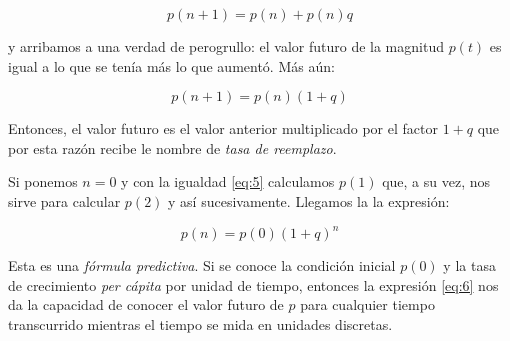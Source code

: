  \begin{equation} \label{eq:4}
 p(n+1)=p(n)+p(n)q
\end{equation}

\noindent y arribamos a una verdad de perogrullo: el valor futuro de la magnitud $p(t)$ es igual a lo que se tenía más lo que aumentó. Más aún:

 \begin{equation} \label{eq:5}
 p(n+1)=p(n)(1+q)
\end{equation}

Entonces, el valor futuro es el valor anterior multiplicado por el factor $1+q$ que por esta razón recibe le nombre de \emph{tasa de reemplazo}.

Si ponemos $n=0$ y con la igualdad \ref{eq:5} calculamos $p(1)$ que, a su vez, nos sirve para calcular $p(2)$ y así sucesivamente. Llegamos la la expresión:

 \begin{equation} \label{eq:6}
 p(n)=p(0)(1+q)^n
\end{equation}

Esta es una \emph{fórmula predictiva}. Si se conoce la condición inicial $p(0)$ y la tasa de crecimiento \emph{per cápita} por unidad de tiempo, entonces la expresión \ref{eq:6} nos da la capacidad de conocer el valor futuro de $p$ para cualquier tiempo transcurrido mientras el tiempo se mida en unidades discretas.

\begin{exe}
		
\end{exe}


